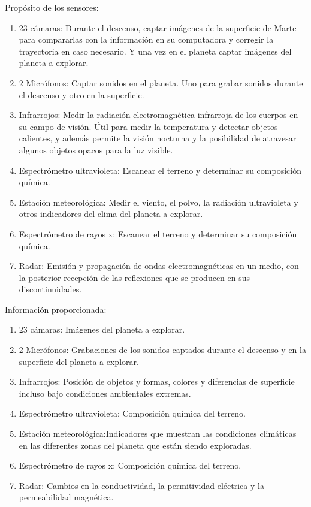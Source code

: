 \documentclass{article}
\begin{document}
        Propósito de los sensores:
        \begin{enumerate}
            \item 23 cámaras: Durante el descenso, captar imágenes de la superficie de Marte para compararlas con la información en su computadora y corregir la trayectoria en caso necesario. Y una vez en el planeta captar imágenes del planeta a explorar.
            \item 2 Micrófonos: Captar sonidos en el planeta. Uno para grabar sonidos durante el descenso y otro en la superficie.
            \item Infrarrojos: Medir la radiación electromagnética infrarroja de los cuerpos en su campo de visión. Útil para medir la temperatura y detectar objetos calientes, y además permite la visión nocturna y la posibilidad de atravesar algunos objetos opacos para la luz visible.
            \item Espectrómetro ultravioleta: Escanear el terreno y determinar su composición química.
            \item Estación meteorológica: Medir el viento, el polvo, la radiación ultravioleta y otros indicadores del clima del planeta a explorar.
            \item Espectrómetro de rayos x: Escanear el terreno y determinar su composición química.
            \item Radar: Emisión y propagación de ondas electromagnéticas en un medio, con la posterior recepción de las reflexiones que se producen en sus discontinuidades.
        \end{enumerate}

        Información proporcionada:
        \begin{enumerate}
            \item 23 cámaras: Imágenes del planeta a explorar.
            \item 2 Micrófonos: Grabaciones de los sonidos captados durante el descenso y en la superficie del planeta a explorar.
            \item Infrarrojos: Posición de objetos y formas, colores y diferencias de superficie incluso bajo condiciones ambientales extremas.
            \item Espectrómetro ultravioleta: Composición química del terreno.
            \item Estación meteorológica:Indicadores que muestran las condiciones climáticas en las diferentes zonas del planeta que están siendo exploradas.
            \item Espectrómetro de rayos x: Composición química del terreno.
            \item Radar: Cambios en la conductividad, la permitividad eléctrica y la permeabilidad magnética.
        \end{enumerate}
\end{document}

